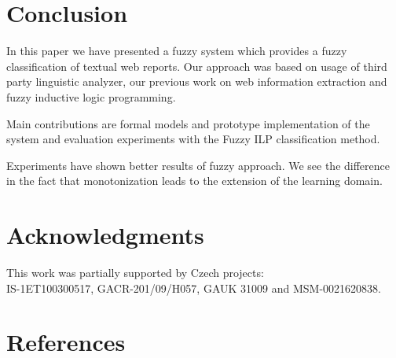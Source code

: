 \documentclass[authoryear,12pt]{elsarticle}
\begin{document}
%
%
%
%


\section{Conclusion}
In this paper we have presented a fuzzy system which provides a fuzzy classification of textual web reports. Our approach was based on usage of third party linguistic analyzer, our previous work on web information extraction and fuzzy inductive logic programming.

Main contributions are formal models and prototype implementation of the system and evaluation experiments with the Fuzzy ILP classification method.

Experiments have shown better results of fuzzy approach. We see the difference in the fact that monotonization leads to the extension of the learning domain.

%

\section*{Acknowledgments}
This work was partially supported by Czech projects: \\IS-1ET100300517, GACR-201/09/H057, GAUK 31009 and MSM-0021620838.

\section*{References}



\end{document}
